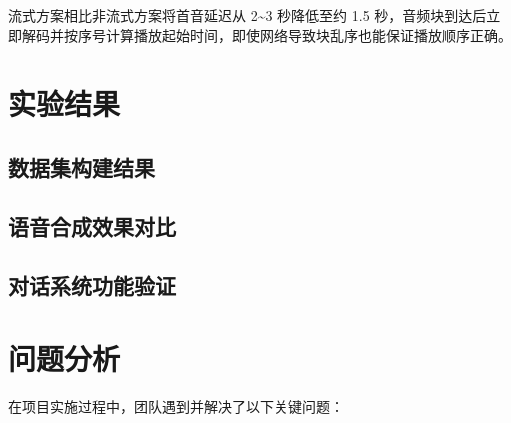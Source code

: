 \documentclass[12pt,a4paper]{article}
\begin{document}
流式方案相比非流式方案将首音延迟从 2\textasciitilde 3 秒降低至约 1.5 秒，音频块到达后立即解码并按序号计算播放起始时间，即使网络导致块乱序也能保证播放顺序正确。

\section{实验结果}
\label{sec:results}

\subsection{数据集构建结果}
\label{sec:result-data}

%
%

\subsection{语音合成效果对比}
\label{sec:result-tts}

%
%

\subsection{对话系统功能验证}
\label{sec:result-dialogue}

%
%

\section{问题分析}
\label{sec:problems}

在项目实施过程中，团队遇到并解决了以下关键问题：
\end{document}
